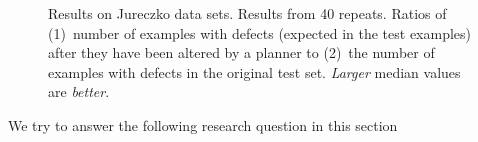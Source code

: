 \documentclass{sig-alternative}
\newcommand{\quart}[3]{\begin{picture}(100,6)%
{\color{black}\put(#3,3){\circle*{4}}\put(#1,3){\line(1,0){#2}}}\end{picture}}
\begin{document}
\begin{figure}[!b]

\caption{Results on  Jureczko   data sets. Results from 40 repeats.
Ratios of (1)~number of examples with defects 
(expected in the test
examples) after they have been altered by a planner to (2)~the number of examples
with defects in the
original test set. {\em Larger} median values are {\em better}.}
\label{fig:jur}
\end{figure}


We try to answer the following research question in this section\\
\end{document}
